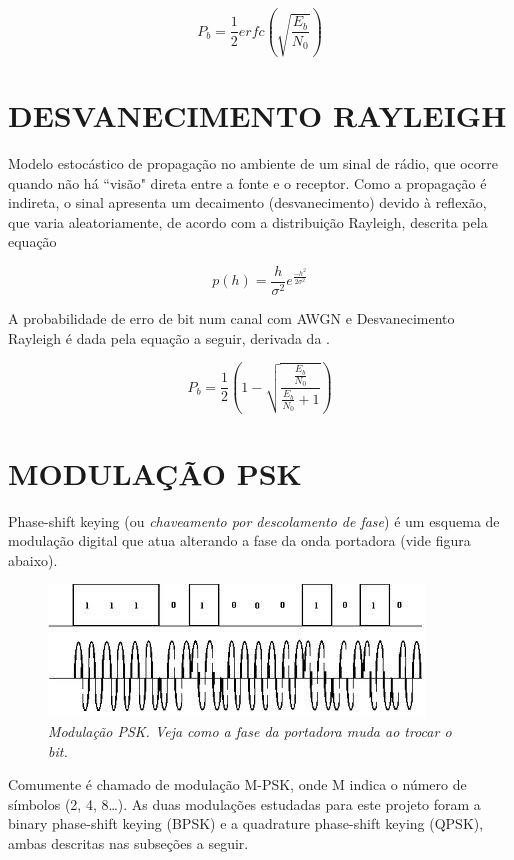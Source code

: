 \documentclass[a4paper,twocolumn]{article}
\begin{document}
\begin{equation}
    \label{eq:prob_bit}
    P_b = \frac{1}{2}erfc(\sqrt{\frac{E_b}{N_0}})
\end{equation}


\section{DESVANECIMENTO RAYLEIGH}

Modelo estocástico de propagação no ambiente de um sinal de rádio, que ocorre quando não há ``visão" direta entre a fonte e o receptor. Como a propagação é indireta, o sinal apresenta um decaimento (desvanecimento) devido à reflexão, que varia aleatoriamente, de acordo com a distribuição Rayleigh, descrita pela equação

\begin{equation}
    p(h) = \frac{h}{\sigma^2}e^\frac{-h^2}{2\sigma^2}
\end{equation}

A probabilidade de erro de bit num canal com AWGN e Desvanecimento Rayleigh é dada pela equação a seguir, derivada da .

\begin{equation}
    P_b = \frac{1}{2}(1 - \sqrt{\frac{\frac{E_b}{N_0}}{\frac{E_b}{N_0} + 1}})
\end{equation}


\section{MODULAÇÃO PSK}

Phase-shift keying (ou \textit{chaveamento por descolamento de fase}) é um esquema de modulação digital que atua alterando a fase da onda portadora (vide figura abaixo).

\begin{figure}[h]
    \label{fig:psk_mod}
    \centering
    \includegraphics[scale=0.55]{psk-mod}
    \caption{\textit{Modulação PSK. Veja como a fase da portadora muda ao trocar o bit.}}
\end{figure}

Comumente é chamado de modulação M-PSK, onde M indica o número de símbolos (2, 4, 8\dots). As duas modulações estudadas para este projeto foram a binary phase-shift keying (BPSK) e a quadrature phase-shift keying (QPSK), ambas descritas nas subseções a seguir.
\end{document}
